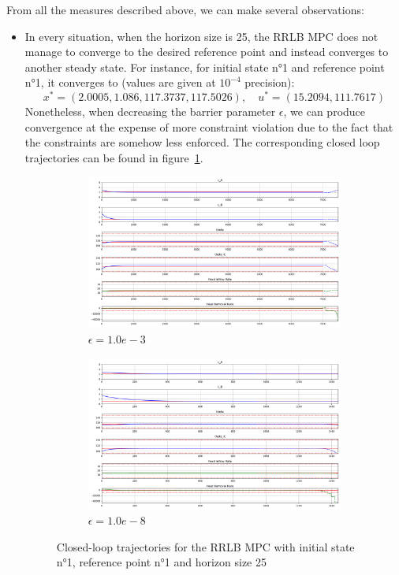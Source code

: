 \documentclass[12pt]{article}
\begin{document}
\noindent From all the measures described above, we can make several observations:

\begin{itemize}[label=\textbullet]
	\item In every situation, when the horizon size is 25, the RRLB MPC does not manage to converge to the desired reference point and instead converges to another steady state.
	For instance, for initial state n°1 and reference point n°1, it converges to (values are given at $10^{-4}$ precision):
	$$x^*=(2.0005, 1.086, 117.3737, 117.5026),\quad u^*=(15.2094, 111.7617)$$
	Nonetheless, when decreasing the barrier parameter $\epsilon$, we can produce convergence at the expense of more constraint violation due to the fact that the constraints are somehow less enforced.
	The corresponding closed loop trajectories can be found in figure~\ref{fig:closedloop_traj_rrlb_1_1_25}.

	\begin{figure}[!hp]
		\centering
		\begin{subfigure}{15cm}
			\centering
			\includegraphics[width=15cm]{images/closedloop_traj_rrlb_1_1_25_not_converge.png}
			\caption{$\epsilon=1.0e-3$}
		\end{subfigure}
		\begin{subfigure}{15cm}
			\centering
			\includegraphics[width=15cm]{images/closedloop_traj_rrlb_1_1_25_converge.png}
			\caption{$\epsilon=1.0e-8$}
		\end{subfigure}
		\caption{Closed-loop trajectories for the RRLB MPC with initial state n°1, reference point n°1 and horizon size 25}
		\label{fig:closedloop_traj_rrlb_1_1_25}
	\end{figure}


\end{itemize}
\end{document}
